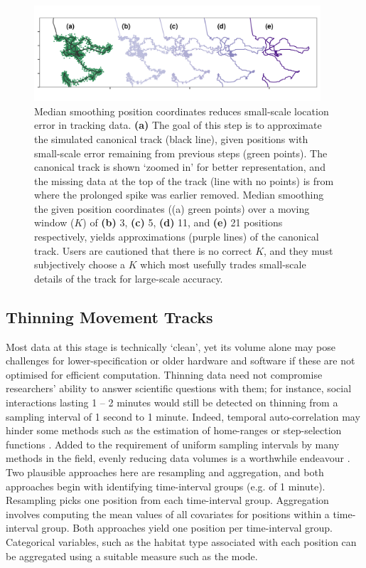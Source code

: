 \documentclass[10pt,paper=a4,headings=standardclasses
]{scrartcl}
\begin{document}
\begin{figure}[h!]
    \centering
    \includegraphics[width=0.95\textwidth]{figures/fig_03_median_smooth.png}
    \caption{Median smoothing position coordinates reduces small-scale location error in tracking data. 
    \textbf{(a)} The goal of this step is to approximate the simulated canonical track (black line), given positions with small-scale error remaining from previous steps (green points). 
    The canonical track is shown `zoomed in' for better representation, and the missing data at the top of the track (line with no points) is from where the prolonged spike was earlier removed.
    Median smoothing the given position coordinates ((a) green points) over a moving window ($K$) of \textbf{(b)} 3, \textbf{(c)} 5, \textbf{(d)} 11, and \textbf{(e)} 21 positions respectively, yields approximations (purple lines) of the canonical track.
    Users are cautioned that there is no correct $K$, and they must subjectively choose a $K$ which most usefully trades small-scale details of the track for large-scale accuracy.}
    \label{fig:figure_median_smooth}
\end{figure}

\subsection{Thinning Movement Tracks}

Most data at this stage is technically ‘clean’, yet its volume alone may pose challenges for lower-specification or older hardware and software if these are not optimised for efficient computation.
Thinning data need not compromise researchers' ability to answer scientific questions with them; for instance, social interactions lasting 1 -- 2 minutes would still be detected on thinning from a sampling interval of 1 second to 1 minute.
Indeed, temporal auto-correlation may hinder some methods such as the estimation of home-ranges or step-selection functions \citep{fleming2014a, dupke2017}.
Added to the requirement of uniform sampling intervals by many methods in the field, evenly reducing data volumes is a worthwhile endeavour \citep[e.g.][]{fleming2014a, michelot2016, avgar2016}.
Two plausible approaches here are resampling and aggregation, and both approaches begin with identifying time-interval groups (e.g. of 1 minute).
Resampling picks one position from each time-interval group.
Aggregation involves computing the mean values of all covariates for positions within a time-interval group.
Both approaches yield one position per time-interval group.
Categorical variables, such as the habitat type associated with each position can be aggregated using a suitable measure such as the mode.
\end{document}
